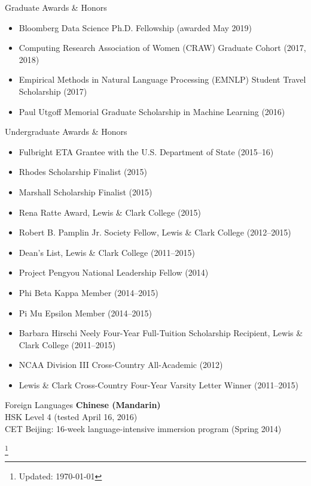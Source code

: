 \documentclass{resume} %
\newcommand\blfootnote[1]{%
  \begingroup
  \renewcommand\thefootnote{}\footnote{#1}%
  \addtocounter{footnote}{-1}%
  \endgroup
}
\begin{document}
\begin{rSection}{Graduate Awards \& Honors}
\begin{itemize}
\item Bloomberg Data Science Ph.D. Fellowship (awarded May 2019)  
\item Computing Research Association of Women (CRAW) Graduate Cohort (2017, 2018) 
\item Empirical Methods in Natural Language Processing (EMNLP) Student Travel Scholarship (2017)
\item Paul Utgoff Memorial Graduate Scholarship in Machine Learning (2016) 
\end{itemize} 
\end{rSection}

\begin{rSection}{Undergraduate Awards \& Honors}
\begin{itemize}
\item Fulbright ETA Grantee with the U.S. Department of State (2015--16)
\item Rhodes Scholarship Finalist (2015) 
\item Marshall Scholarship Finalist (2015) 
\item Rena Ratte Award, Lewis \& Clark College (2015) 
\item Robert B. Pamplin Jr. Society Fellow, Lewis \& Clark College (2012--2015)
\item Dean's List, Lewis \& Clark College (2011--2015)
\item Project Pengyou National Leadership Fellow (2014) 
\item Phi Beta Kappa Member (2014--2015)
\item Pi Mu Epsilon Member (2014--2015)
\item Barbara Hirschi Neely Four-Year Full-Tuition Scholarship Recipient, Lewis \& Clark College (2011--2015)
\item NCAA Division III Cross-Country All-Academic (2012) 
\item Lewis \& Clark Cross-Country Four-Year Varsity Letter Winner (2011--2015)
\end{itemize} 
\end{rSection}


\begin{rSection}{Foreign Languages}
\textbf{Chinese (Mandarin)} \\
HSK Level 4 (tested April 16, 2016) \\
CET Beijing: 16-week language-intensive immersion program (Spring 2014)
\end{rSection}

\blfootnote{Updated: \today}
\end{document}
